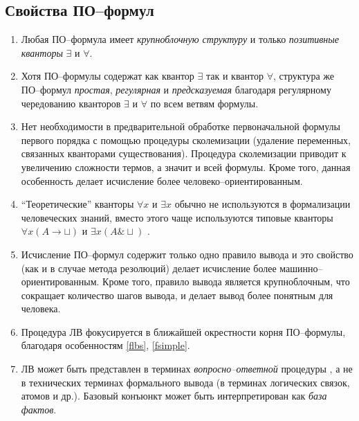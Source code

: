 \subsection{Свойства ПО--формул}

\begin{enumerate}
\item\label{flbs} Любая ПО--формула имеет {\em крупноблочную структуру} и только {\em позитивные кванторы} $\exists$ и $\forall$.
%
\item\label{fsimple} Хотя ПО--формулы содержат как квантор $\exists$ так и квантор $\forall$, структура же ПО--формул {\em простая}, {\em регулярная} и {\em предсказуемая} благодаря регулярному чередованию кванторов $\exists$ и $\forall$ по всем ветвям формулы.
%
\item Нет необходимости в предварительной обработке первоначальной формулы первого порядка с помощью процедуры сколемизации (удаление переменных, связанных кванторами существования). Процедура сколемизации приводит к увеличению сложности термов, а значит и всей формулы. Кроме того, данная особенность делает исчисление более человеко--ориентированным.
%
\item ``Теоретические'' кванторы $\forall x$ и $\exists x$ обычно не используются в формализации человеческих знаний, вместо этого чаще используются типовые кванторы $\forall x(A \rightarrow \sqcup)$ и $\exists x(A \& \sqcup)$ \cite{Bourbaki, ICDS2000, NNN}.
%
\item\label{frule} Исчисление ПО--формул содержит только одно правило вывода и это свойство (как и в случае метода резолюций) делает исчисление более машинно--ориентированным. Кроме того, правило вывода является крупноблочным, что сокращает количество шагов вывода, и делает вывод более понятным для человека.
%
\item\label{froot} Процедура ЛВ фокусируется в ближайшей окрестности корня ПО--фор\-му\-лы, благодаря особенностям \ref{flbs}, \ref{fsimple}.
%
\item\label{fqa} ЛВ может быть представлен в терминах {\em вопросно--ответной} процедуры \cite{ICDS2000}, а не в технических терминах формального вывода (в терминах логических связок, атомов и др.). Базовый конъюнкт может быть интерпретирован как {\em база фактов}.

\end{enumerate}
